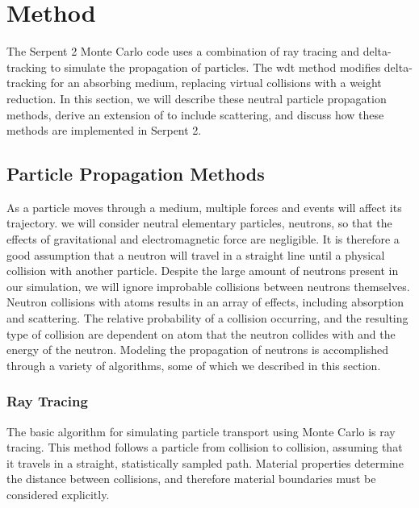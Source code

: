 \chapter{Method}
\label{chap:method}

The Serpent 2 Monte Carlo code uses a combination of  ray tracing and
delta-tracking to simulate the propagation of particles. The \gls{wdt}
method modifies delta-tracking for an absorbing medium, replacing virtual
collisions with a weight reduction. In this section, we will describe
these neutral particle propagation methods, derive an extension of \wdt{} to
include scattering, and discuss how these methods are implemented in
Serpent 2.

\section{Particle Propagation Methods}
\label{sec:propagation}

As a particle moves through a medium, multiple forces and events will
affect its trajectory. we will consider neutral elementary particles,
neutrons, so that the effects of gravitational and electromagnetic
force are negligible. It is therefore a good assumption that a neutron
will travel in a straight line until a physical collision with another
particle. Despite the large amount of neutrons present in our
simulation, we will ignore improbable collisions between neutrons
themselves. Neutron collisions with atoms results in an array of
effects, including absorption and scattering. The relative probability
of a collision occurring, and the resulting type of collision are
dependent on atom that the neutron collides with and the energy of the
neutron. Modeling the propagation of neutrons is accomplished through
a variety of algorithms, some of which we described in this section.

\subsection{Ray Tracing}
\label{sec:ray_tracing}

The basic algorithm for simulating particle transport using Monte Carlo is
ray tracing. This method follows a particle from collision to
collision, assuming that it travels in a straight, statistically
sampled path. Material properties determine the distance between
collisions, and therefore material boundaries must be considered explicitly.

